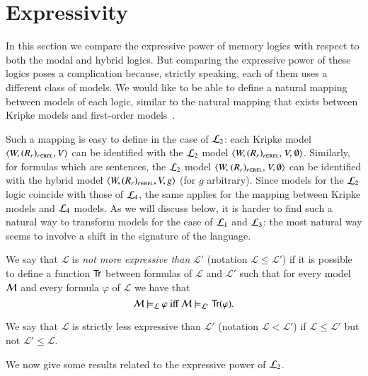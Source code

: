 \section{Expressivity}\label{expressivity}

In this section we compare the expressive power of memory logics
with respect to both the modal and hybrid logics.
But comparing the expressive power of these logics poses a complication
because, strictly speaking, each of them uses a different class of models.
We would like to be able to define a natural mapping between models
of each logic, similar to the natural mapping that exists between
Kripke models and first-order models~\cite{BRV01}.

Such a mapping is easy to define in the case of $\mathcal{L}_2$: each
Kripke model $\langle W,(R_r)_{r \in \textsc{rel}},V \rangle$ can be identified with the $\mathcal{L}_2$
model $\diam{W,\rels,$ $V,$ $\emptyset}$. Similarly, for formulas
which are sentences, the $\mathcal{L}_2$ model $\diam{W,$ \linebreak
$\rels,$ $V,\emptyset}$ can be identified with the hybrid model
$\langle W,(R_r)_{r \in \textsc{rel}},V,g \rangle$ (for $g$ arbitrary).
%
Since models for the $\mathcal{L}_2$ logic coincide with those of
$\mathcal{L}_4$, the same applies for the mapping between Kripke models
and $\mathcal{L}_4$ models.
%
As we will discuss below, it is harder to find such a natural way to
transform models for the case of $\mathcal{L}_1$ and $\mathcal{L}_3$: the most
natural way seems to involve a shift in the signature of the
language.

\begin{defn}
We say that
$\mathcal{L}$ is \emph{not more expressive than} $\mathcal{L'}$
(notation $\mathcal{L} \le \mathcal{L'}$) if it is possible to
define a function ${\sf Tr}$ between formulas of  $\mathcal{L}$ and $\mathcal{L'}$
such that for every model $\mathcal{M}$ and every formula $\varphi$ of $\mathcal{L}$
we have that
$$
\mathcal{M} \models_\mathcal{L} \varphi \mbox{ iff } \mathcal{M} \models_{\mathcal{L}'} {\sf Tr}(\varphi).
$$

We say that $\mathcal{L}$ is strictly less expressive than $\mathcal{L'}$
(notation $\mathcal{L} < \mathcal{L'}$) if $\mathcal{L} \le \mathcal{L'}$ but
not $\mathcal{L}' \le \mathcal{L}$.
\end{defn}


We now give some results related to the expressive power of
$\mathcal{L}_2$.

